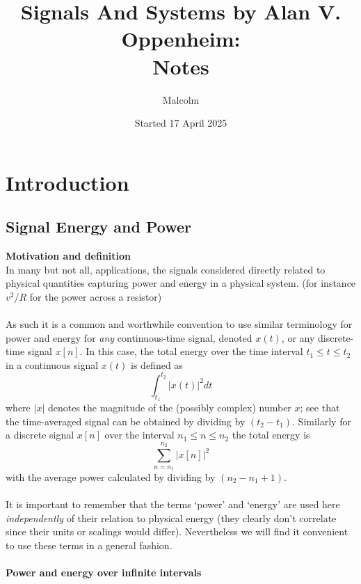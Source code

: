 \documentclass{report}
\title{Signals And Systems by Alan V. Oppenheim:\\Notes}
\date{Started 17 April 2025}
\author{Malcolm}
\begin{document}
\maketitle

\tableofcontents

\newpage
\section{Introduction}
\subsection{Signal Energy and Power}
\textbf{Motivation and definition}\\
In many but not all, applications, the signals considered directly related to physical quantities capturing
power and energy in a physical system. (for instance $v^2/R$ for the power across a resistor)\\
\vspace{1mm}\\
As such it is a common and worthwhile convention to use similar terminology for power and energy for \textit{any} 
continuous-time signal, denoted $x(t)$, or any discrete-time signal $x[n]$. 
In this case, the total energy over the time interval $t_1\leq t\leq t_2$ in a continuous signal $x(t)$ is defined
as
\begin{equation*}
\int^{t_2}_{t_1}|x(t)|^2dt
\end{equation*}
where $|x|$ denotes the magnitude of the (possibly complex) number $x$; see that the time-averaged signal 
can be obtained by dividing by $(t_2-t_1)$. Similarly for a discrete signal $x[n]$ over the interval $n_1\leq n\leq n_2$ the total energy is
\begin{equation*}
\sum^{n_2}_{n=n_1}|x[n]|^2
\end{equation*}
with the average power calculated by dividing by $(n_2-n_1+1)$.\\
\vspace{1mm}\\
It is important to remember that the terms `power' and `energy' are used here \textit{independently} of their 
relation to physical energy (they clearly don't correlate since their units or scalings would differ). Nevertheless
we will find it convenient to use these terms in a general fashion.\\
\vspace{1mm}\\
\textbf{Power and energy over infinite intervals}\\
\end{document}
